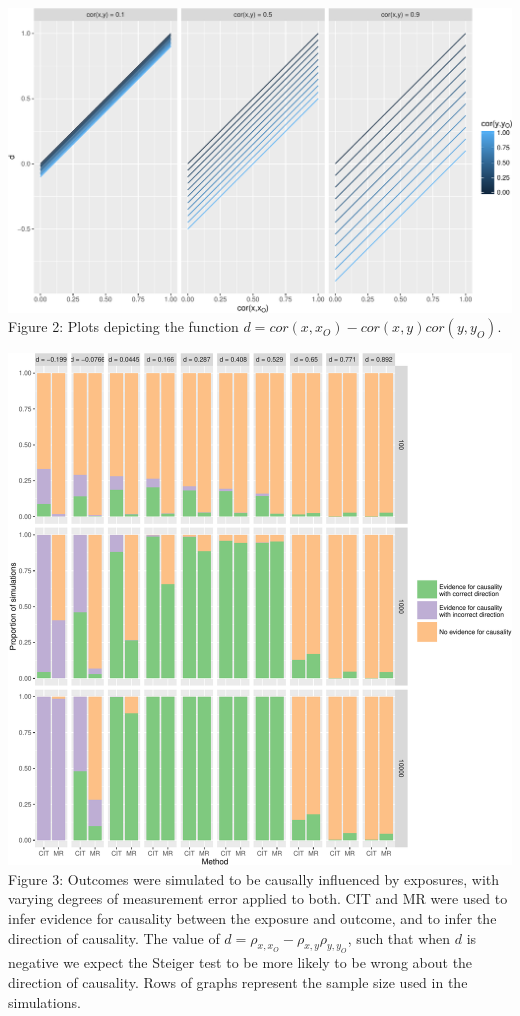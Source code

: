 \documentclass[]{article}
\begin{document}
\newpage

\includegraphics{manuscript_files/figure-latex/d_relationship_figure-1.pdf}\\
Figure 2: Plots depicting the function
\(d = cor(x, x_O) - cor(x,y)cor(y, y_O)\).

\newpage

\includegraphics{manuscript_files/figure-latex/cit_mr_comparison_figure-1.pdf}\\
Figure 3: Outcomes were simulated to be causally influenced by
exposures, with varying degrees of measurement error applied to both.
CIT and MR were used to infer evidence for causality between the
exposure and outcome, and to infer the direction of causality. The value
of \(d = \rho_{x, x_O} - \rho_{x,y}\rho_{y,y_O}\), such that when \(d\)
is negative we expect the Steiger test to be more likely to be wrong
about the direction of causality. Rows of graphs represent the sample
size used in the simulations.
\end{document}
